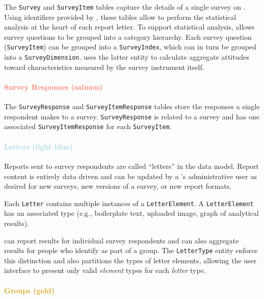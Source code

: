 \documentclass{article}
\begin{document}
The \texttt{Survey} and \texttt{SurveyItem} tables
capture the details of a single survey on \qual.
Using identifiers provided by \qual,
these tables allow \caper{} to perform the statistical analysis at the heart of each report letter.
To support statistical analysis,
\caper{} allows survey questions to be grouped into a category hierarchy.
Each survey question (\texttt{SurveyItem})
can be grouped into a \texttt{SurveyIndex},
which can in turn be grouped into a \texttt{SurveyDimension}.
\caper{} uses the latter entity to calculate aggregate attitudes
toward characteristics measured by the survey instrument itself.

\paragraph{\textcolor{Salmon}{Survey Responses (salmon)}}

The \texttt{SurveyResponse}
and \texttt{SurveyItemResponse}
tables store the responses a single respondent
makes to a survey.
\texttt{SurveyResponse} is related to a survey
and has one associated \texttt{SurveyItemResponse}
for each \texttt{SurveyItem}.

\paragraph{\textcolor{LightBlue}{Letters (light blue)}}

Reports sent to survey respondents are called ``letters'' in the data model.
Report content is entirely data driven and can be updated by a \caper's administrative user
as desired for new surveys, new versions of a survey, or new report formats.

Each \texttt{Letter} contains multiple
instances of a \texttt{LetterElement}.
A \texttt{LetterElement} has an associated type
(e.g., boilerplate text,
uploaded image,
graph of analytical results).

\caper{} can report results for individual survey respondents
and can also aggregate results for people who identify as part of a group.
The \texttt{LetterType} entity enforce this distinction
and also partitions the types of letter elements,
allowing the user interface to present only valid \emph{element} types
for each \emph{letter} type.

\paragraph{\textcolor{Goldenrod}{Groups (gold)}}
\end{document}
